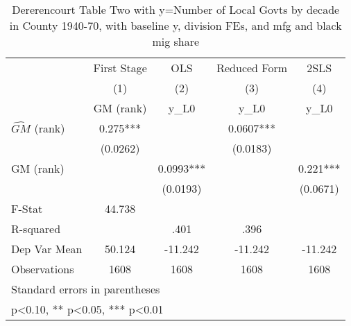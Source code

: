 \begin{table}[htbp]\centering
\def\sym#1{\ifmmode^{#1}\else\(^{#1}\)\fi}
\caption{Dererencourt Table Two with y=Number of Local Govts by decade in County 1940-70, with baseline y, division FEs, and mfg and black mig share}
\begin{tabular}{l*{4}{c}}
\toprule
                    & First Stage   &         OLS   &Reduced Form   &        2SLS   \\
                    &\multicolumn{1}{c}{(1)}&\multicolumn{1}{c}{(2)}&\multicolumn{1}{c}{(3)}&\multicolumn{1}{c}{(4)}\\
                    &\multicolumn{1}{c}{GM  (rank)}&\multicolumn{1}{c}{y\_L0}&\multicolumn{1}{c}{y\_L0}&\multicolumn{1}{c}{y\_L0}\\
\midrule
$\hat{GM}$ (rank)   &       0.275***&               &      0.0607***&               \\
                    &    (0.0262)   &               &    (0.0183)   &               \\
\addlinespace
GM  (rank)          &               &      0.0993***&               &       0.221***\\
                    &               &    (0.0193)   &               &    (0.0671)   \\
\midrule
F-Stat              &      44.738   &               &               &               \\
R-squared           &               &        .401   &        .396   &               \\
Dep Var Mean        &      50.124   &     -11.242   &     -11.242   &     -11.242   \\
Observations        &        1608   &        1608   &        1608   &        1608   \\
\bottomrule
\multicolumn{5}{l}{\footnotesize Standard errors in parentheses}\\
\multicolumn{5}{l}{\footnotesize * p<0.10, ** p<0.05, *** p<0.01}\\
\end{tabular}
\end{table}
